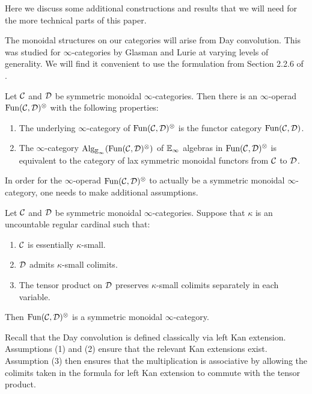 \label{sect:monoidal2}

Here we discuss some additional constructions and results that we will need for the more technical parts of this paper.  %

The monoidal structures on our categories will arise from Day convolution.  This was studied for $\infty$-categories by Glasman \cite{Glasman} and Lurie \cite{LurieRot, HA} at varying levels of generality.  We will find it convenient to use the formulation from Section 2.2.6 of \cite{HA}.  

\begin{thm}
Let $\operatorname{\mathcal{C}}$ and $\operatorname{\mathcal{D}}$ be symmetric monoidal $\infty$-categories.  Then there is an $\infty$-operad $\operatorname{\text{Fun}}(\operatorname{\mathcal{C}}, \operatorname{\mathcal{D}})^{\otimes} $ with the following properties:
\begin{enumerate}
\item The underlying $\infty$-category of $\operatorname{\text{Fun}}(\operatorname{\mathcal{C}},\operatorname{\mathcal{D}})^{\otimes}$ is the functor category $\operatorname{\text{Fun}}(\operatorname{\mathcal{C}}, \operatorname{\mathcal{D}})$.
\item The $\infty$-category $\operatorname{\text{Alg}}_{\operatorname{\mathbb{E}}_\infty}(\operatorname{\text{Fun}}(\operatorname{\mathcal{C}}, \operatorname{\mathcal{D}})^{\otimes})$ of $\operatorname{\mathbb{E}}_\infty$ algebras in $\operatorname{\text{Fun}}(\operatorname{\mathcal{C}},\operatorname{\mathcal{D}})^{\otimes}$ is equivalent to the category of lax symmetric monoidal functors from $\operatorname{\mathcal{C}}$ to $\operatorname{\mathcal{D}}$.  

\end{enumerate}
\end{thm}

In order for the $\infty$-operad $\operatorname{\text{Fun}}(\operatorname{\mathcal{C}},\operatorname{\mathcal{D}})^{\otimes}$ to actually be a symmetric monoidal $\infty$-category, one needs to make additional assumptions.  

\begin{prop}\label{prop:dayconvsmc}
Let $\operatorname{\mathcal{C}}$ and $\operatorname{\mathcal{D}}$ be symmetric monoidal $\infty$-categories.  Suppose that $\kappa$ is an uncountable regular cardinal such that:
\begin{enumerate}
\item $\operatorname{\mathcal{C}}$ is essentially $\kappa$-small.
\item $\operatorname{\mathcal{D}}$ admits $\kappa$-small colimits.
\item The tensor product on $\operatorname{\mathcal{D}}$ preserves $\kappa$-small colimits separately in each variable.  
\end{enumerate}
Then $\operatorname{\text{Fun}}(\operatorname{\mathcal{C}},\operatorname{\mathcal{D}})^{\otimes}$ is a symmetric monoidal $\infty$-category.  
\end{prop}

Recall that the Day convolution is defined classically via left Kan extension.  Assumptions (1) and (2) ensure that the relevant Kan extensions exist.  Assumption (3) then ensures that the multiplication is associative by allowing the colimits taken in the formula for left Kan extension to commute with the tensor product.  

